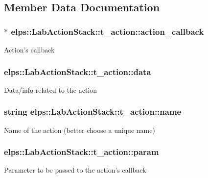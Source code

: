 \subsection{Member Data Documentation}
\hypertarget{structelps_1_1_lab_action_stack_1_1t__action_a4fda46c1a55ac7921c92fa2b30a123b4}{
\subsubsection[{action\+\_\+callback}]{$\ast$ elps\+::\+Lab\+Action\+Stack\+::t\+\_\+action\+::action\+\_\+callback}}\label{structelps_1_1_lab_action_stack_1_1t__action_a4fda46c1a55ac7921c92fa2b30a123b4}
Action's callback \hypertarget{structelps_1_1_lab_action_stack_1_1t__action_a7f63822bfba007763473fa78fe9497db}{
\subsubsection[{data}]{ elps\+::\+Lab\+Action\+Stack\+::t\+\_\+action\+::data}}\label{structelps_1_1_lab_action_stack_1_1t__action_a7f63822bfba007763473fa78fe9497db}
Data/info related to the action \hypertarget{structelps_1_1_lab_action_stack_1_1t__action_acdc18958bac7c55da868d608a6860a85}{
\subsubsection[{name}]{\setlength{\rightskip}{0pt plus 5cm}string elps\+::\+Lab\+Action\+Stack\+::t\+\_\+action\+::name}}\label{structelps_1_1_lab_action_stack_1_1t__action_acdc18958bac7c55da868d608a6860a85}
Name of the action (better choose a unique name) \hypertarget{structelps_1_1_lab_action_stack_1_1t__action_a99a344aa82b0e099c188d7efae094261}{
\subsubsection[{param}]{ elps\+::\+Lab\+Action\+Stack\+::t\+\_\+action\+::param}}\label{structelps_1_1_lab_action_stack_1_1t__action_a99a344aa82b0e099c188d7efae094261}
Parameter to be passed to the action's callback 